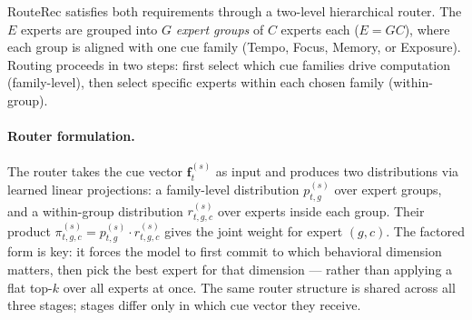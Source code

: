 \documentclass[sigconf,review,anonymous]{acmart}
\begin{document}
RouteRec satisfies both requirements through a two-level hierarchical router. The $E$ experts are grouped into $G$ \emph{expert groups} of $C$ experts each ($E = GC$), where each group is aligned with one cue family (Tempo, Focus, Memory, or Exposure). Routing proceeds in two steps: first select which cue families drive computation (family-level), then select specific experts within each chosen family (within-group).

\paragraph{Router formulation.}
The router takes the cue vector $\mathbf{f}^{(s)}_t$ as input and produces two distributions via learned linear projections: a family-level distribution $p^{(s)}_{t,g}$ over expert groups, and a within-group distribution $r^{(s)}_{t,g,c}$ over experts inside each group. Their product $\pi^{(s)}_{t,g,c} = p^{(s)}_{t,g} \cdot r^{(s)}_{t,g,c}$ gives the joint weight for expert $(g,c)$. The factored form is key: it forces the model to first commit to which behavioral dimension matters, then pick the best expert for that dimension --- rather than applying a flat top-$k$ over all experts at once. The same router structure is shared across all three stages; stages differ only in which cue vector they receive.
\end{document}

